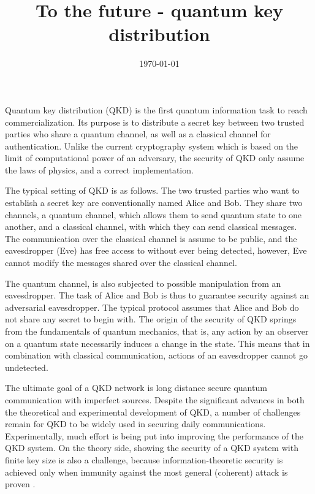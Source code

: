 \documentclass[reprint,
superscriptaddress,
 amsmath,amssymb,
 aps,
prb,
]{revtex4-1}
\begin{document}

\title{To the future - quantum key distribution }




\begin{abstract}

\end{abstract}

\date{\today}

\maketitle

% 
Quantum key distribution (QKD) is the first quantum information task
to reach commercialization. Its purpose is to distribute a secret
key between two trusted parties who share a quantum channel,
as well as a classical channel for authentication. Unlike the current
cryptography system which is based on the limit of computational power of an adversary, the security of QKD only assume the laws of physics, and a 
correct implementation.


The typical setting of QKD is as follows. The two trusted parties who
want to establish a secret key are conventionally named Alice and Bob.
They share two channels, a quantum channel, which allows them to send
quantum state to one another, and a classical channel, with which they can
send classical messages. The communication over the classical channel is
assume to be public, and the eavesdropper (Eve) has free access to without 
ever being detected, however, Eve cannot modify the messages shared over
the classical channel.

 The quantum channel, is also subjected to possible manipulation from an
 eavesdropper. The task of Alice and Bob is thus to guarantee security
against an adversarial eavesdropper. The typical protocol assumes that
Alice and Bob do not share any secret to begin with.
The origin of the security of QKD springs from the fundamentals
of quantum mechanics, that is, any action by an observer on
a quantum state necessarily induces a change in the state. This means
that in combination with classical communication, actions of an eavesdropper cannot go undetected.


The ultimate goal of a QKD network is long distance secure quantum communication with imperfect sources.
% 
Despite the significant advances in both the theoretical and experimental development of QKD, a number of challenges remain for QKD to be widely used 
in securing daily communications\cite{RevModPhys.81.1301,diamanti2016practical}. Experimentally, much effort is being put into improving the performance of the QKD system. On the theory side, 
showing the security of a QKD system with finite key size is also a challenge,  
because information-theoretic security is achieved only when immunity against the most general (coherent) attack is proven \cite{diamanti2016practical}.
\end{document}

